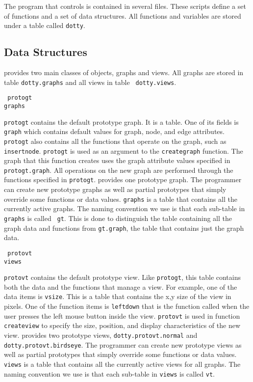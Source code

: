 The {\LEFTY} program that controls {\DOTTY} is contained in several files.
These scripts define a set of functions and a set of data structures.  All
functions and variables are stored under a table called {\tt dotty}.

\subsection{Data Structures}
{\DOTTY} provides two main classes of objects, graphs and views.  All graphs
are stored in table {\tt dotty.graphs} and all views in table {\tt
dotty.views}.

\begin{flushleft}\tt
protogt\\
graphs\\
\end{flushleft}\vspace{-2\itemsep}
{\tt protogt} contains the default prototype graph. It is a table. One of its
fields is {\tt graph} which contains default values for graph, node, and edge
attributes.  {\tt protogt} also contains all the functions that operate on the
graph, such as {\tt insertnode}. {\tt protogt} is used as an argument to the
{\tt creategraph} function. The graph that this function creates uses the graph
attribute values specified in {\tt protogt.graph}. All operations on the new
graph are performed through the functions specified in {\tt protogt}. {\DOTTY}
provides one prototype graph. The programmer can create new prototype graphs as
well as partial prototypes that simply override some functions or data values.
{\tt graphs} is a table that contains all the currently active graphs. The
naming convention we use is that each sub-table in {\tt graphs} is called {\tt
gt}. This is done to distinguish the table containing all the graph data and
functions from {\tt gt.graph}, the table that contains just the graph data.

\begin{flushleft}\tt
protovt\\
views\\
\end{flushleft}\vspace{-2\itemsep}
{\tt protovt} contains the default prototype view. Like {\tt protogt}, this
table contains both the data and the functions that manage a view. For example,
one of the data items is {\tt vsize}. This is a table that contains the x,y
size of the view in pixels. One of the function items is {\tt leftdown} that is
the function called when the user presses the left mouse button inside the
view. {\tt protovt} is used in function {\tt createview} to specify the size,
position, and display characteristics of the new view. {\DOTTY} provides two
prototype views, {\tt dotty.protovt.normal} and {\tt dotty.protovt.birdseye}.
The programmer can create new prototype views as well as partial prototypes
that simply override some functions or data values.  {\tt views} is a table
that contains all the currently active views for all graphs. The naming
convention we use is that each sub-table in {\tt views} is called {\tt vt}.

